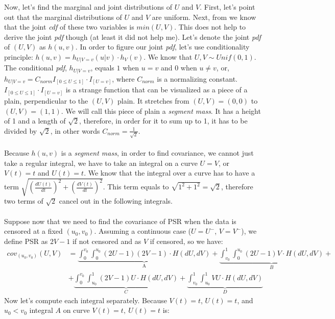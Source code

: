 \documentclass[]{article}
\begin{document}
Now, let's find the marginal and joint distributions of $U$ and $V$. First, let's point out that the marginal distributions of $U$ and $V$ are uniform. Next, from \cite{nelsen2007introduction} we know that the joint \emph{cdf} of these two variables is $min(U, V)$. This does not help to derive the joint \emph{pdf} though (at least it did not help me). Let's denote the joint \emph{pdf} of $(U, V)$ as $h(u, v)$. In order to figure our joint \emph{pdf}, let's use conditionality principle: $h(u, v)=h_{U|V=v}(u|v)\cdot h_V(v)$. We know that $U,V \sim Unif(0, 1)$. The conditional \emph{pdf}, $h_{U|V=v}$, equals $1$ when $u=v$ and $0$ when $u\neq v$, or, $h_{U|V=v} = C_{norm}I_{[0\leq U \leq 1]}\cdot I_{[U=v]}$, where $C_{norm}$ is a normalizing constant. $I_{[0\leq U \leq 1]}\cdot I_{[U=v]}$ is a strange function that can be visualized as a piece of a plain, perpendicular to the $(U,V)$ plain. It stretches from $(U,V) = (0, 0)$ to $(U,V) = (1,1)$. We will call this piece of plain a \emph{segment mass}. It has a height of 1 and a length of $\sqrt{2}$, therefore, in order for it to sum up to 1, it has to be divided by $\sqrt{2}$, in other words $C_{norm}=\frac{1}{\sqrt{2}}$.\\
~\\
Because $h(u, v)$ is a \emph{segment mass}, in order to find covariance, we cannot just take a regular integral, we have to take an integral on a curve $U=V$, or $V(t)=t$ and $U(t) = t$. We know that the integral over a curve has to have a term $\sqrt{\left(\frac{dU(t)}{dt}\right)^2 + \left(\frac{dV(t)}{dt}\right)^2}$. This term equals to $\sqrt{1^2 + 1^2} = \sqrt{2}$, therefore two terms of $\sqrt{2}$ cancel out in the following integrals.\\
~\\
Suppose now that we need to find the covariance of PSR when the data is censored at a fixed $(u_0, v_0)$. Assuming a continuous case ($U = U^-$, $V = V^-$), we define PSR as $2V - 1$ if not censored and as $V$ if censored, so we have:
	$$
	\begin{aligned}
    cov_{(u_0, v_0)}(U, V) &= \underbrace{\int_0^{v_0}\int_0^{u_0} (2U - 1)(2V - 1)\cdot H(dU, dV)}_{\text{A}} + \underbrace{\int_{v_0}^{1}\int_0^{u_0} (2U - 1)V\cdot H(dU, dV)}_{B} + \\
    &+\underbrace{\int_{0}^{v_0}\int_{u_0}^1 (2V - 1)U\cdot H(dU, dV)}_{C} + \underbrace{\int_{v_0}^{1}\int_{u_0}^1 VU\cdot H(dU, dV)}_{D}
	\end{aligned}
	$$
Now let's compute each integral separately. Because $V(t)=t$, $U(t) = t$, and $u_0 < v_0$ integral $A$ on curve $V(t)=t,~U(t) = t$ is:
\end{document}
